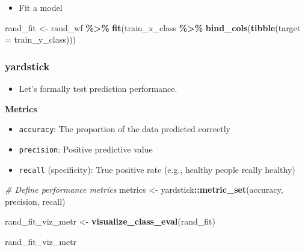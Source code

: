 \documentclass[
]{book}
\newenvironment{Shaded}{\begin{snugshade}}{\end{snugshade}}
\newcommand{\CommentTok}[1]{\textcolor[rgb]{0.56,0.35,0.01}{\textit{#1}}}
\newcommand{\DataTypeTok}[1]{\textcolor[rgb]{0.13,0.29,0.53}{#1}}
\newcommand{\KeywordTok}[1]{\textcolor[rgb]{0.13,0.29,0.53}{\textbf{#1}}}
\newcommand{\NormalTok}[1]{#1}
\newcommand{\OperatorTok}[1]{\textcolor[rgb]{0.81,0.36,0.00}{\textbf{#1}}}
\newcommand{\StringTok}[1]{\textcolor[rgb]{0.31,0.60,0.02}{#1}}
\providecommand{\tightlist}{%
  \setlength{\itemsep}{0pt}\setlength{\parskip}{0pt}}
\begin{document}
\begin{itemize}
\tightlist
\item
  Fit a model
\end{itemize}

\begin{Shaded}
\begin{Highlighting}[]
\NormalTok{rand\_fit \textless{}{-}}\StringTok{ }\NormalTok{rand\_wf }\OperatorTok{\%\textgreater{}\%}\StringTok{ }\KeywordTok{fit}\NormalTok{(train\_x\_class }\OperatorTok{\%\textgreater{}\%}\StringTok{ }\KeywordTok{bind\_cols}\NormalTok{(}\KeywordTok{tibble}\NormalTok{(}\DataTypeTok{target =}\NormalTok{ train\_y\_class)))}
\end{Highlighting}
\end{Shaded}

\hypertarget{yardstick-2}{%
\subsubsection{yardstick}\label{yardstick-2}}

\begin{itemize}
\tightlist
\item
  Let's formally test prediction performance.
\end{itemize}

\textbf{Metrics}

\begin{itemize}
\item
  \texttt{accuracy}: The proportion of the data predicted correctly
\item
  \texttt{precision}: Positive predictive value
\item
  \texttt{recall} (specificity): True positive rate (e.g., healthy people really healthy)
\end{itemize}

\begin{Shaded}
\begin{Highlighting}[]
\CommentTok{\# Define performance metrics }
\NormalTok{metrics \textless{}{-}}\StringTok{ }\NormalTok{yardstick}\OperatorTok{::}\KeywordTok{metric\_set}\NormalTok{(accuracy, precision, recall)}

\NormalTok{rand\_fit\_viz\_metr \textless{}{-}}\StringTok{ }\KeywordTok{visualize\_class\_eval}\NormalTok{(rand\_fit)}

\NormalTok{rand\_fit\_viz\_metr}
\end{Highlighting}
\end{Shaded}
\end{document}
